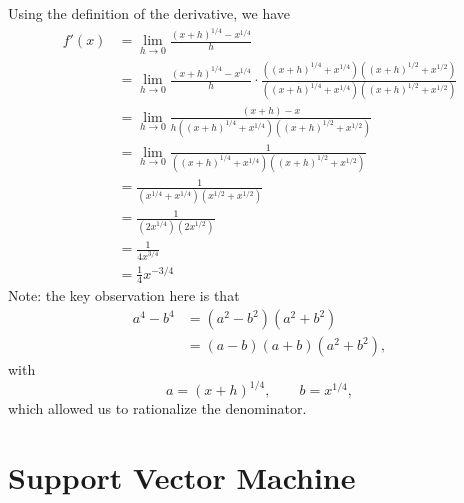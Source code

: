 \documentclass[10pt,a4paper]{report}
\theoremstyle{myn}
\theoremstyle{myu}
\begin{document}
Using the definition of the derivative, we have
\begin{align*}
            f'(x)           &= \lim_{h\rightarrow 0}\frac{(x+h)^{1/4}-x^{1/4}}{h}   \\
                            &=  \lim_{h\rightarrow 0}\frac{(x+h)^{1/4}-x^{1/4}}{h}\cdot \frac{((x+h)^{1/4}+x^{1/4})((x+h)^{1/2}+x^{1/2})}{((x+h)^{1/4}+x^{1/4})((x+h)^{1/2}+x^{1/2})}\\
                            &=  \lim_{h\rightarrow 0}\frac{(x+h)-x}{h((x+h)^{1/4}+x^{1/4})((x+h)^{1/2}+x^{1/2})}    \\  
                            &=  \lim_{h\rightarrow 0}\frac{1}{((x+h)^{1/4}+x^{1/4})((x+h)^{1/2}+x^{1/2})}   \\
                            &= \frac{1}{(x^{1/4}+x^{1/4})(x^{1/2}+x^{1/2})} \\
                            &=  \frac{1}{(2x^{1/4})(2x^{1/2})}  \\
                            &=  \frac{1}{4x^{3/4}}  \\
                            &=  \frac{1}{4}x^{-3/4}
\end{align*}
Note: the key observation here is that
\begin{align*}
    a^4-b^4 &= (a^2-b^2)(a^2+b^2)   \\
        &= (a-b)(a+b)(a^2+b^2), 
\end{align*}
with 
\[
    a = (x+h)^{1/4}, \qquad b = x^{1/4},
\]
which allowed us to rationalize the denominator.

\clearpage


\section{Support Vector Machine}
\end{document}
